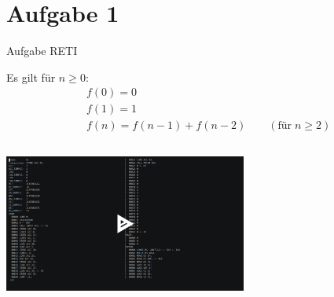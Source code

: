 
\section{Aufgabe 1}

\setcounter{exercise}{1}

\begin{frame}{Aufgabe \thesection}{RETI}
    \begin{exercisenoinc}
      Es gilt für $n\ge 0$:
      \begin{align*}
        &f(0) = 0\\
        &f(1) = 1\\
        &f(n)={f(n-1)+f(n-2)}\qquad (\text{für}\;n\geq2)
      \end{align*}
    \end{exercisenoinc}
    \begin{solutionnoinc}
    \end{solutionnoinc}
    \begin{solutionnoinc}
      \begin{columns}
        \begin{column}[t]{0.5\textwidth}
        \end{column}
        \begin{column}[t]{0.5\textwidth}
        \end{column}
      \end{columns}
      \vspace{0.5cm}
    \end{solutionnoinc}
    \begin{solutionnoinc}
      \centering
      \href{https://asciinema.org/a/583721}{\includegraphics[width=0.6\textwidth]{./figures/fib_video.png}}
    \end{solutionnoinc}
\end{frame}
